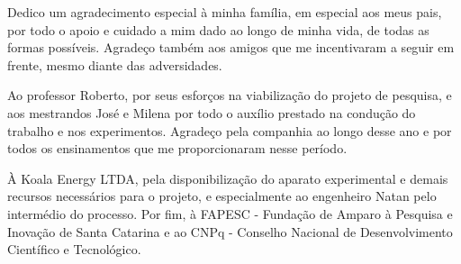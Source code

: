 \begin{agradecimentos}
Dedico um agradecimento especial à minha família, em especial aos meus pais, por todo o apoio e cuidado a mim dado ao longo de minha vida, de todas as formas possíveis. Agradeço também aos amigos que me incentivaram a seguir em frente, mesmo diante das adversidades.

Ao professor Roberto, por seus esforços na viabilização do projeto de pesquisa, e aos mestrandos José e Milena por todo o auxílio prestado na condução do trabalho e nos experimentos. Agradeço pela companhia ao longo desse ano e por todos os ensinamentos que me proporcionaram nesse período.

À Koala Energy LTDA, pela disponibilização do aparato experimental e demais recursos necessários para o projeto, e especialmente ao engenheiro Natan pelo intermédio do processo. Por fim, à FAPESC - Fundação de Amparo à Pesquisa e Inovação de Santa Catarina e ao CNPq - Conselho Nacional de Desenvolvimento Científico e Tecnológico.

\end{agradecimentos}
